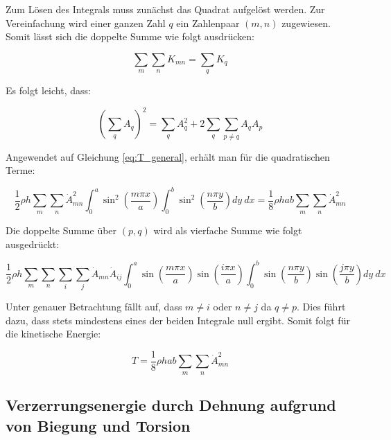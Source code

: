 Zum Lösen des Integrals muss zunächst das Quadrat aufgelöst werden. Zur Vereinfachung wird einer ganzen Zahl $q$ ein Zahlenpaar $(m,n)$ zugewiesen.
Somit lässt sich die doppelte Summe wie folgt ausdrücken:

$$\sum_m\sum_n K_{mn}=\sum_q K_q$$

Es folgt leicht, dass:

$$\left(\sum_qA_q\right)^2=\sum_qA^2_q+2\sum_q\sum_{p\neq q}A_qA_p$$


Angewendet auf Gleichung \ref{eq:T_general}, erhält man für die quadratischen Terme:

\begin{equation}
\dfrac{1}{2}\rho h \sum_m\sum_n \dot{A}^2_{mn}\int_0^a\sin^2\left(\dfrac{m\pi x}{a}\right)\int_0^b\sin^2\left(\dfrac{n\pi y}{b}\right) dy \ dx=\dfrac{1}{8}\rho h a b\sum_m\sum_n \dot{A}^2_{mn}
\end{equation}

\newpage

Die doppelte Summe über $(p,q)$ wird als vierfache Summe wie folgt ausgedrückt:



\begin{equation}
\dfrac{1}{2}\rho h \sum_m\sum_n\sum_i\sum_j \dot{A}_{mn}\dot{A}_{ij}\int_0^a\sin\left(\dfrac{m\pi x}{a}\right)\sin\left(\dfrac{i\pi x}{a}\right)\int_0^b\sin\left(\dfrac{n\pi y}{b}\right)\sin\left(\dfrac{j\pi y}{b}\right) dy \ dx
\end{equation}

Unter genauer Betrachtung fällt auf, dass $m\neq i$ oder $n\neq j$ da $q\neq p$. Dies führt dazu, dass stets mindestens eines der beiden Integrale null ergibt. Somit folgt für die kinetische Energie:

\begin{equation}
T = \dfrac{1}{8}\rho h a b\sum_m\sum_n \dot{A}^2_{mn}
\label{eq:T}
\end{equation}









\subsection{Verzerrungsenergie durch Dehnung aufgrund von Biegung und Torsion}

